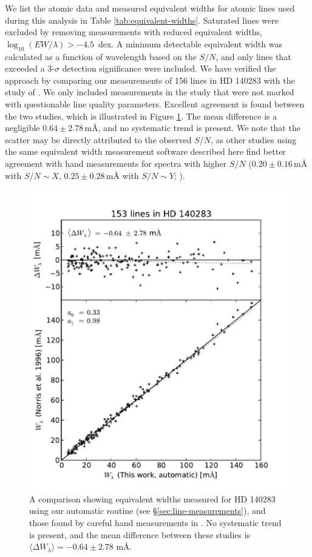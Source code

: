\documentclass{emulateapj}
\begin{document}
We list the atomic data and measured equivalent widths for atomic lines used during this analysis in Table \ref{tab:equivalent-widths}. Saturated lines were excluded by removing measurements with reduced equivalent widths, $\log_{10}{(EW/\lambda)} > -4.5$\, dex. A minimum detectable equivalent width was calculated as a function of wavelength based on the $S/N$, and only lines that exceeded a 3-$\sigma$ detection significance were included. We have verified the approach by comparing our measurements of 156 lines in HD 140283 with the study of \citet{norris;et-al_1996}. We only included measurements in the \citet{norris;et-al_1996} study that were not marked with questionable line quality parameters. Excellent agreement is found between the two studies, which is illustrated in Figure \ref{fig:ew-compare}. The mean difference is a negligible $0.64 \pm 2.78$\,m\AA{}, and no systematic trend is present. We note that the scatter may  be directly attributed to the observed $S/N$, as other studies using the same equivalent width measurement software described here find better agreement with hand measurements for spectra with higher $S/N$ ($0.20 \pm 0.16$\,m{\AA} with $S/N \sim X$, $0.25 \pm 0.28$\,m{\AA} with $S/N \sim{} Y$; \citet{frebel;et-al_2013}).

\begin{figure}[h]
	\includegraphics[width=\columnwidth]{./figures/smh-norris.pdf}
	\caption{A comparison showing equivalent widths measured for HD 140283 using our automatic routine (see \S\ref{sec:line-measurements}), and those found by careful hand measurements in \citet{norris;et-al_1996}. No systematic trend is present, and the mean difference between these studies is $\langle\Delta{}W_\lambda\rangle = -0.64 \pm 2.78$ m\AA{}.}
	\label{fig:ew-compare}
\end{figure}
\end{document}
